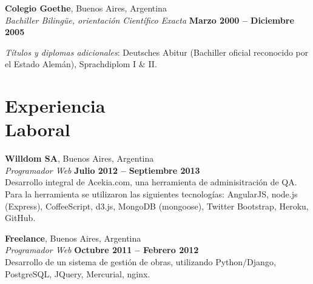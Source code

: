 \documentclass[margin,line]{resume}
\begin{document}
\begin{resume}
    \textbf{Colegio Goethe}, Buenos Aires, Argentina \vspace{2mm}\\\vspace{1mm}%
    \textsl{Bachiller Bilingüe, orientación Científico Exacta} \hfill \textbf{ Marzo 2000 -- Diciembre 2005}\vspace{-3mm}\\\vspace{-1mm}%
    \begin{list2}
        \item \textit{Títulos y diplomas adicionales}: Deutsches Abitur (Bachiller oficial reconocido por el Estado Alemán), Sprachdiplom I \& II.
    \end{list2}\vspace{-1.5mm}

    \section{\mysidestyle Experiencia\\Laboral}

    \textbf{Willdom SA}, Buenos Aires, Argentina \vspace{2mm}\\\vspace{1mm}%
    \textsl{Programador Web} \hfill \textbf{Julio 2012 -- Septiembre 2013}\vspace{1.5mm}\\\vspace{0mm}%
    Desarrollo integral de Acekia.com, una herramienta de adminisitración de QA. Para la herramienta se utilizaron las siguientes tecnologías: AngularJS, node.js (Express), CoffeeScript, d3.js, MongoDB (mongoose), Twitter Bootstrap, Heroku, GitHub.  

    \textbf{Freelance}, Buenos Aires, Argentina \vspace{2mm}\\\vspace{1mm}%
    \textsl{Programador Web} \hfill \textbf{Octubre 2011 -- Febrero 2012}\vspace{1.5mm}\\\vspace{0mm}%
	Desarrollo de un sistema de gestión de obras, utilizando Python/Django, PostgreSQL, JQuery, Mercurial, nginx.


\end{resume}
\end{document}
